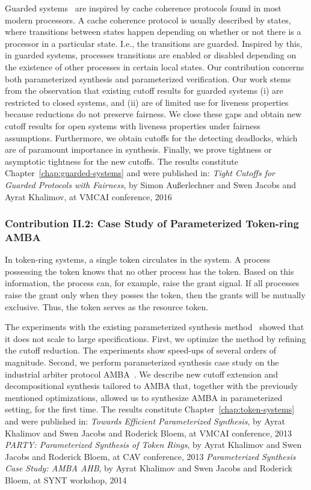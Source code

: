 Guarded systems~\cite{EmersonK03} are inspired by cache coherence protocols found
in most modern processors.
A cache coherence protocol is usually described by states,
where transitions between states happen depending on whether or not
there is a processor in a particular state.
I.e., the transitions are guarded.
Inspired by this, in guarded systems,
processes transitions are enabled or disabled depending
on the existence of other processes in certain local states.
Our contribution concerns both parameterized synthesis and parameterized verification.
Our work stems from the observation that
existing cutoff results for guarded systems
(i) are restricted to closed systems, and
(ii) are of limited use for liveness properties
because reductions do not preserve fairness.
We close these gaps and obtain new cutoff results for open systems with
liveness properties under fairness assumptions.
Furthermore, we obtain cutoffs for the detecting deadlocks,
which are of paramount importance in synthesis.
Finally, we prove tightness or asymptotic tightness for the new cutoffs.
The results constitute Chapter~\ref{chap:guarded-systems}
and were published in:
\li
{}
   \emph{Tight Cutoffs for Guarded Protocols with Fairness},
   by Simon Au{\ss}erlechner and Swen Jacobs and Ayrat Khalimov,
   at VMCAI conference, 2016
\il


\subsubsection*{Contribution II.2: Case Study of Parameterized Token-ring AMBA}

In token-ring systems, a single token circulates in the system.
A process possessing the token knows that no other process has the token.
Based on this information, the process can, for example, raise the grant signal.
If all processes raise the grant only when they posses the token,
then the grants will be mutually exclusive.
Thus, the token serves as the resource token.

The experiments with the existing parameterized synthesis method~\cite{JB14}
showed that it does not scale to large specifications.
First, we optimize the method by refining the cutoff reduction.
The experiments show speed-ups of several orders of magnitude.
Second, we perform parameterized synthesis case study
on the industrial arbiter protocol AMBA~\cite{AMBAspec}.
We describe new cutoff extension and decompositional synthesis tailored to AMBA
that, together with the previously mentioned optimizations,
allowed us to synthesize AMBA in parameterized setting, for the first time.
The results constitute Chapter~\ref{chap:token-systems}
and were published in:
\li
{}
   \emph{Towards Efficient Parameterized Synthesis},
   by Ayrat Khalimov and Swen Jacobs and Roderick Bloem,
   at VMCAI conference, 2013
   \emph{PARTY: Parameterized Synthesis of Token Rings},
   by Ayrat Khalimov and Swen Jacobs and Roderick Bloem,
   at CAV conference, 2013
   \emph{Parameterized Synthesis Case Study: AMBA AHB},
   by Ayrat Khalimov and Swen Jacobs and Roderick Bloem,
   at SYNT workshop, 2014
\il

